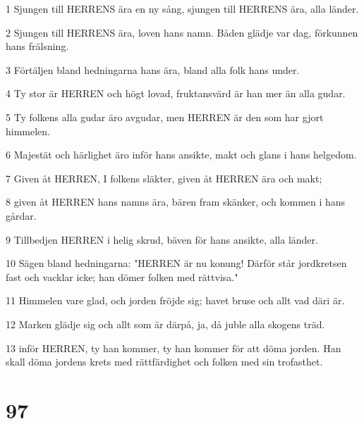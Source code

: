 \par 1 Sjungen till HERRENS ära en ny sång, sjungen till HERRENS ära, alla länder.
\par 2 Sjungen till HERRENS ära, loven hans namn. Båden glädje var dag, förkunnen hans frälsning.
\par 3 Förtäljen bland hedningarna hans ära, bland alla folk hans under.
\par 4 Ty stor är HERREN och högt lovad, fruktansvärd är han mer än alla gudar.
\par 5 Ty folkens alla gudar äro avgudar, men HERREN är den som har gjort himmelen.
\par 6 Majestät och härlighet äro inför hans ansikte, makt och glans i hans helgedom.
\par 7 Given åt HERREN, I folkens släkter, given åt HERREN ära och makt;
\par 8 given åt HERREN hans namns ära, bären fram skänker, och kommen i hans gårdar.
\par 9 Tillbedjen HERREN i helig skrud, bäven för hans ansikte, alla länder.
\par 10 Sägen bland hedningarna: "HERREN är nu konung! Därför står jordkretsen fast och vacklar icke; han dömer folken med rättvisa."
\par 11 Himmelen vare glad, och jorden fröjde sig; havet bruse och allt vad däri är.
\par 12 Marken glädje sig och allt som är därpå, ja, då juble alla skogens träd.
\par 13 inför HERREN, ty han kommer, ty han kommer för att döma jorden. Han skall döma jordens krets med rättfärdighet och folken med sin trofasthet.

\chapter{97}

